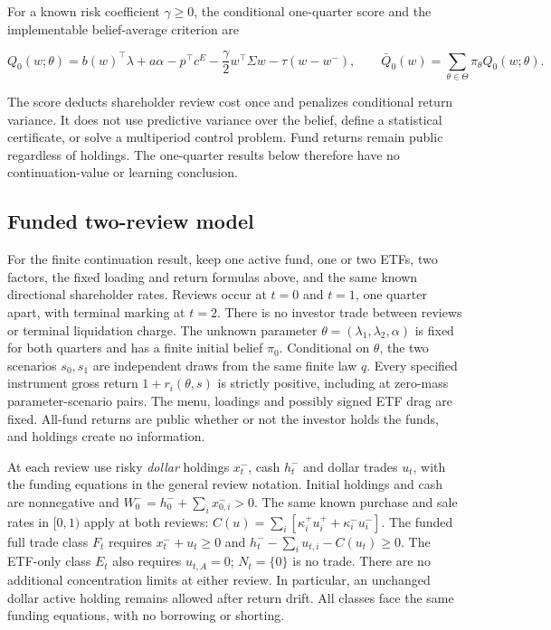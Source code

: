 \documentclass[11pt]{article}
\begin{document}
For a known risk coefficient \(\gamma\geq0\), the conditional
one-quarter score and the implementable belief-average criterion are

\begin{equation*}
Q_0(w;\theta)=b(w)^\top\lambda+a\alpha-p^\top c^E
 -\frac{\gamma}{2}w^\top\Sigma w-\tau(w-w^-),
\qquad
\bar Q_0(w)=\sum_{\theta\in\Theta}\pi_\theta Q_0(w;\theta).
\end{equation*}

The score deducts shareholder review cost once and penalizes
conditional return variance. It does not use predictive variance
over the belief, define a statistical certificate, or solve a
multiperiod control problem. Fund returns remain public regardless
of holdings. The one-quarter results below therefore have no
continuation-value or learning conclusion.

\subsection*{Funded two-review model}

For the finite continuation result, keep one active fund, one or two
ETFs, two factors, the fixed loading and return formulas above, and
the same known directional shareholder rates. Reviews occur at
\(t=0\) and \(t=1\), one quarter apart, with terminal marking at
\(t=2\). There is no investor trade between reviews or terminal
liquidation charge. The unknown parameter
\(\theta=(\lambda_1,\lambda_2,\alpha)\) is fixed for both quarters
and has a finite initial belief \(\pi_0\). Conditional on \(\theta\),
the two scenarios \(s_0,s_1\) are independent draws from the same
finite law \(q\). Every specified instrument gross return
\(1+r_i(\theta,s)\) is strictly positive, including at zero-mass
parameter-scenario pairs. The menu, loadings and possibly signed
ETF drag are fixed. All-fund returns are public whether or not the
investor holds the funds, and holdings create no information.

At each review use risky \emph{dollar} holdings \(x_t^-\), cash \(h_t^-\)
and dollar trades \(u_t\), with the funding equations in the general
review notation. Initial holdings and cash are nonnegative and
\(W_0^-=h_0^-+\sum_i x_{0,i}^->0\). The same known purchase and
sale rates in \([0,1)\) apply at both reviews:
\(C(u)=\sum_i[\kappa_i^+u_i^++\kappa_i^-u_i^-]\).
The funded full trade class \(F_t\) requires
\(x_t^-+u_t\geq0\) and
\(h_t^--\sum_i u_{t,i}-C(u_t)\geq0\).
The ETF-only class \(E_t\) also requires \(u_{t,A}=0\);
\(N_t=\{0\}\) is no trade. There are no additional concentration
limits at either review. In particular, an unchanged dollar
active holding remains allowed after return drift. All classes
face the same funding equations, with no borrowing or shorting.
\end{document}
